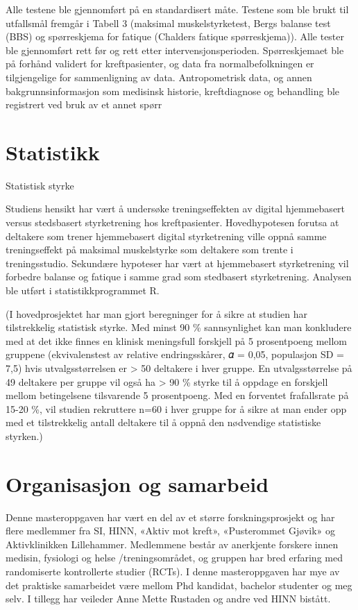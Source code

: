\documentclass[
  letterpaper,
  DIV=11,
  numbers=noendperiod]{scrreprt}
\begin{document}
Alle testene ble gjennomført på en standardisert måte. Testene som ble
brukt til utfallsmål fremgår i Tabell 3 (maksimal muskelstyrketest,
Bergs balanse test (BBS) og spørreskjema for fatique (Chalders fatique
spørreskjema)). Alle tester ble gjennomført rett før og rett etter
intervensjonsperioden. Spørreskjemaet ble på forhånd validert for
kreftpasienter, og data fra normalbefolkningen er tilgjengelige for
sammenligning av data. Antropometrisk data, og annen
bakgrunnsinformasjon som medisinsk historie, kreftdiagnose og behandling
ble registrert ved bruk av et annet spørr

\hypertarget{statistikk}{%
\section{Statistikk}\label{statistikk}}

Statistisk styrke

Studiens hensikt har vært å undersøke treningseffekten av digital
hjemmebasert versus stedsbasert styrketrening hos kreftpasienter.
Hovedhypotesen forutsa at deltakere som trener hjemmebasert digital
styrketrening ville oppnå samme treningseffekt på maksimal muskelstyrke
som deltakere som trente i treningsstudio. Sekundære hypoteser har vært
at hjemmebasert styrketrening vil forbedre balanse og fatique i samme
grad som stedbasert styrketrening. Analysen ble utført i
statistikkprogrammet R.

(I hovedprosjektet har man gjort beregninger for å sikre at studien har
tilstrekkelig statistisk styrke. Med minst 90 \% sannsynlighet kan man
konkludere med at det ikke finnes en klinisk meningsfull forskjell på 5
prosentpoeng mellom gruppene (ekvivalenstest av relative endringsskårer,
𝛼 = 0,05, populasjon SD = 7,5) hvis utvalgsstørrelsen er \textgreater{}
50 deltakere i hver gruppe. En utvalgsstørrelse på 49 deltakere per
gruppe vil også ha \textgreater{} 90 \% styrke til å oppdage en
forskjell mellom betingelsene tilsvarende 5 prosentpoeng. Med en
forventet frafallsrate på 15-20 \%, vil studien rekruttere n=60 i hver
gruppe for å sikre at man ender opp med et tilstrekkelig antall
deltakere til å oppnå den nødvendige statistiske styrken.)

\hypertarget{organisasjon-og-samarbeid}{%
\section{Organisasjon og samarbeid}\label{organisasjon-og-samarbeid}}

Denne masteroppgaven har vært en del av et større forskningsprosjekt og
har flere medlemmer fra SI, HINN, «Aktiv mot kreft», «Pusterommet
Gjøvik» og Aktivklinikken Lillehammer. Medlemmene består av anerkjente
forskere innen medisin, fysiologi og helse /treningsområdet, og gruppen
har bred erfaring med randomiserte kontrollerte studier (RCTs). I denne
masteroppgaven har mye av det praktiske samarbeidet være mellom Phd
kandidat, bachelor studenter og meg selv. I tillegg har veileder Anne
Mette Rustaden og andre ved HINN bistått.
\end{document}
